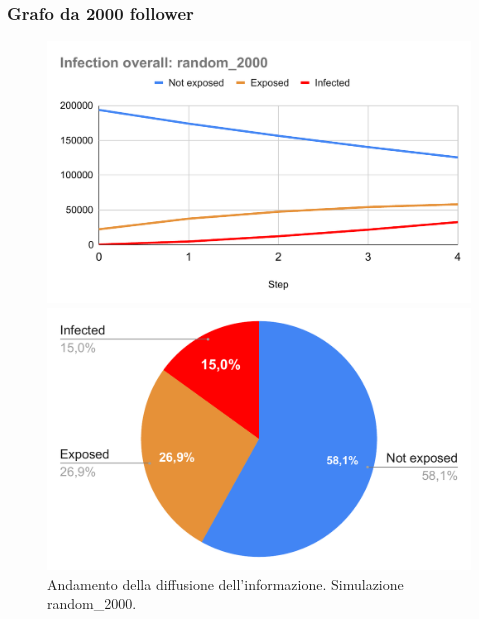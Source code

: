     \subsubsection{Grafo da 2000 follower}

        \begin{figure}[H]
            \centering
            \begin{minipage}[c]{0.55\textwidth}
                \includegraphics[width=\textwidth]{resources/charts/Infection overall_ random_2000.pdf}
            \end{minipage}
            \hfill
            \begin{minipage}[c]{0.44\textwidth}
                \includegraphics[width=\textwidth]{resources/charts/pie_random_2000.pdf}
            \end{minipage}
            \caption{Andamento della diffusione dell'informazione. Simulazione random\_2000.}
        \end{figure}
        

